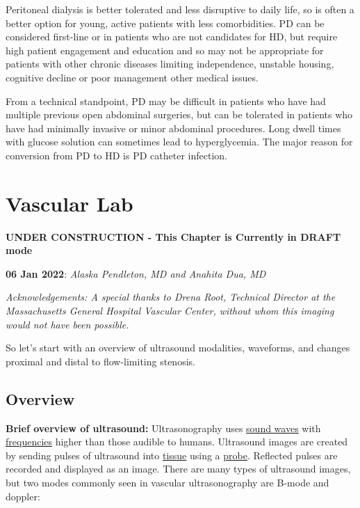 \documentclass[
]{book}
\begin{document}
Peritoneal dialysis is better tolerated and less disruptive to daily
life, so is often a better option for young, active patients with less
comorbidities. PD can be considered first-line or in patients who are
not candidates for HD, but require high patient engagement and education
and so may not be appropriate for patients with other chronic diseases
limiting independence, unstable housing, cognitive decline or poor
management other medical issues.\citep{ansari2011}

From a technical standpoint, PD may be difficult in patients who have
had multiple previous open abdominal surgeries, but can be tolerated in
patients who have had minimally invasive or minor abdominal
procedures.\citep{sinnakirouchenan2011} Long dwell times with glucose
solution can sometimes lead to hyperglycemia. The major reason for
conversion from PD to HD is PD catheter infection.\citep{li2017}

\hypertarget{vascular-lab}{%
\chapter{Vascular Lab}\label{vascular-lab}}

\textbf{UNDER CONSTRUCTION - This Chapter is Currently in DRAFT mode}

\textbf{06 Jan 2022}: \emph{Alaska Pendleton, MD and Anahita Dua, MD}

\emph{Acknowledgements: A special thanks to Drena Root, Technical Director at
the Massachusetts General Hospital Vascular Center, without whom this
imaging would not have been possible.}

So let's start with an overview of ultrasound modalities, waveforms, and
changes proximal and distal to flow-limiting stenosis.

\hypertarget{overview}{%
\section{\texorpdfstring{\textbf{Overview}}{Overview}}\label{overview}}

\textbf{Brief overview of ultrasound:} Ultrasonography uses \href{https://en.wikipedia.org/wiki/Sound_wave}{sound
waves} with
\href{https://en.wikipedia.org/wiki/Frequency}{frequencies} higher than those
audible to humans. Ultrasound images are created by sending pulses of
ultrasound into \href{https://en.wikipedia.org/wiki/Tissue_(biology)}{tissue}
using a
\href{https://en.wikipedia.org/wiki/Ultrasound_transducer\#Use_in_medicine}{probe}.
Reflected pulses are recorded and displayed as an image. There are many
types of ultrasound images, but two modes commonly seen in vascular
ultrasonography are B-mode and doppler:
\end{document}
